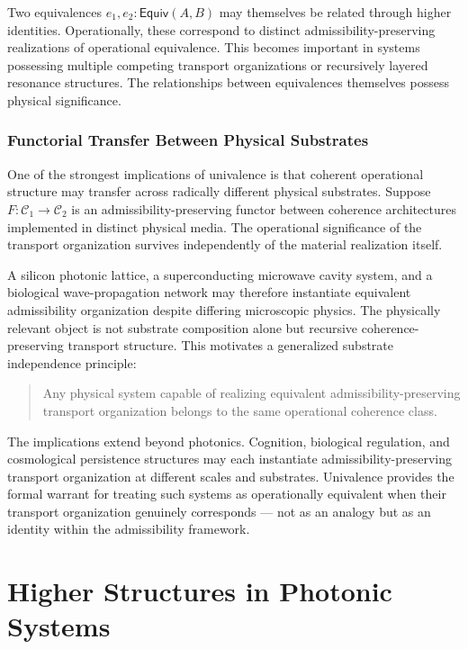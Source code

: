\documentclass[11pt,openany]{book}
\theoremstyle{definition}
\theoremstyle{plain}
\newcommand{\Equiv}{\mathsf{Equiv}}
\begin{document}
Two equivalences $e_1, e_2 : \Equiv(A,B)$ may themselves be related through higher identities. Operationally, these correspond to distinct admissibility-preserving realizations of operational equivalence. This becomes important in systems possessing multiple competing transport organizations or recursively layered resonance structures. The relationships between equivalences themselves possess physical significance.

\section{Functorial Transfer Between Physical Substrates}

One of the strongest implications of univalence is that coherent operational structure may transfer across radically different physical substrates. Suppose $F : \mathcal{C}_1 \to \mathcal{C}_2$ is an admissibility-preserving functor between coherence architectures implemented in distinct physical media. The operational significance of the transport organization survives independently of the material realization itself.

A silicon photonic lattice, a superconducting microwave cavity system, and a biological wave-propagation network may therefore instantiate equivalent admissibility organization despite differing microscopic physics. The physically relevant object is not substrate composition alone but recursive coherence-preserving transport structure. This motivates a generalized substrate independence principle:

\begin{quote}
Any physical system capable of realizing equivalent admissibility-preserving transport organization belongs to the same operational coherence class.
\end{quote}

The implications extend beyond photonics. Cognition, biological regulation, and cosmological persistence structures may each instantiate admissibility-preserving transport organization at different scales and substrates. Univalence provides the formal warrant for treating such systems as operationally equivalent when their transport organization genuinely corresponds --- not as an analogy but as an identity within the admissibility framework.


\part{Higher Structures in Photonic Systems}
\end{document}
